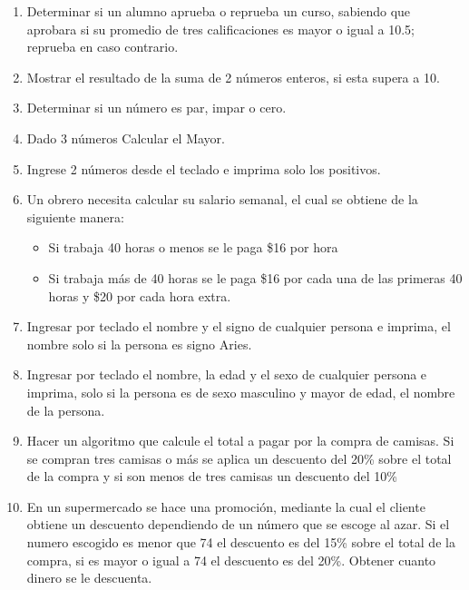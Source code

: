 \documentclass{scrartcl}
\begin{document}
	\begin{enumerate}
		
		\item Determinar si un alumno aprueba o reprueba un curso, sabiendo que aprobara si su promedio de tres calificaciones es mayor o igual a 10.5; reprueba en caso contrario.
		
		\item Mostrar el resultado de la suma de 2 números enteros, si esta supera a 10.
		
		\item Determinar si un número es par, impar o cero.
		
		\item Dado 3 números Calcular el Mayor.
		
		\item Ingrese 2 números desde el teclado e imprima solo los positivos.
		
		\item Un obrero necesita calcular su salario semanal, el cual se obtiene de la
		siguiente manera:
		
			\begin{itemize}
				\item Si trabaja 40 horas o menos se le paga \$16 por hora
				\item Si trabaja más de 40 horas se le paga \$16 por cada una de las primeras 40 horas
				y \$20 por cada hora extra.		
			\end{itemize}
		
		
		\item Ingresar por teclado el nombre y el signo de cualquier persona e imprima, el
		nombre solo si la persona es signo Aries.
		
		\item Ingresar por teclado el nombre, la edad y el sexo de cualquier persona e	imprima, solo si la persona es de sexo masculino y mayor de edad, el nombre de la persona.
		
		\item Hacer un algoritmo que calcule el total a pagar por la compra de camisas. Si se compran tres camisas o más se aplica un descuento del 20\% sobre el total de la compra y si son menos de tres camisas un descuento del 10\%
		
		\item En un supermercado se hace una promoción, mediante la cual el cliente		obtiene un descuento dependiendo de un número que se escoge al azar. Si el		numero escogido es menor que 74 el descuento es del 15\% sobre el total de la compra, si es mayor o igual a 74 el descuento es del 20\%. Obtener cuanto		dinero se le descuenta.
		

\end{enumerate}
\end{document}

